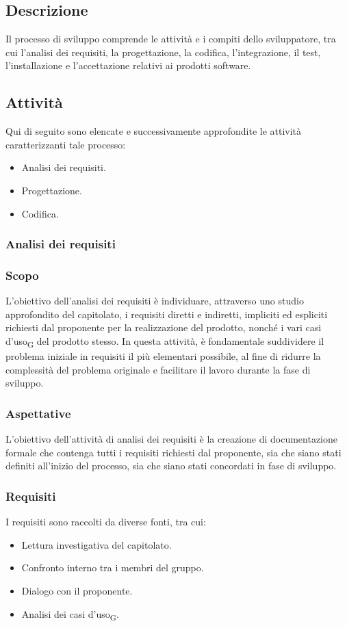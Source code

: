 \documentclass{article}
\begin{document}
\subsection{Descrizione}
Il processo di sviluppo comprende le attività e i compiti dello sviluppatore, tra cui l'analisi dei requisiti, la progettazione, la codifica, l'integrazione, il test, l'installazione e l'accettazione relativi ai prodotti software.

\subsection{Attività}
Qui di seguito sono elencate e successivamente approfondite le attività caratterizzanti tale processo:
\begin{itemize}
    \item Analisi dei requisiti.
    \item Progettazione.
    \item Codifica.
\end{itemize}
\subsubsection{Analisi dei requisiti}
\subsubsection*{Scopo}
L'obiettivo dell'analisi dei requisiti è individuare, attraverso uno studio approfondito del capitolato, i requisiti diretti e indiretti, impliciti ed espliciti richiesti dal proponente per la realizzazione del prodotto, nonché i vari casi d'uso\textsubscript{G} del prodotto stesso. In questa attività, è fondamentale suddividere il problema iniziale in requisiti il più elementari possibile, al fine di ridurre la complessità del problema originale e facilitare il lavoro durante la fase di sviluppo.
\subsubsection*{Aspettative}
L'obiettivo dell'attività di analisi dei requisiti è la creazione di documentazione formale che contenga tutti i requisiti richiesti dal proponente, sia che siano stati definiti all'inizio del processo, sia che siano stati concordati in fase di sviluppo.
\subsubsection*{Requisiti}
I requisiti sono raccolti da diverse fonti, tra cui:
\begin{itemize}
    \item Lettura investigativa del capitolato.
    \item Confronto interno tra i membri del gruppo.
    \item Dialogo con il proponente.
    \item Analisi dei casi d'uso\textsubscript{G}.
\end{itemize}
\end{document}
